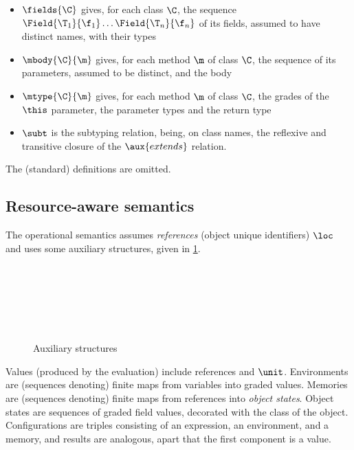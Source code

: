 \begin{itemize}
\item $\fields{\C}$ gives, for each class $\C$, the sequence $\Field{\T_1}{\f_1}\ldots\Field{\T_n}{\f_n}$ of its fields,  assumed to have distinct names,   with their types
\item $\mbody{\C}{\m}$ gives, for each method $\m$ of class $\C$, the sequence of its parameters, assumed to be distinct, and the body
\item  $\mtype{\C}{\m}$ gives, for each method $\m$ of class $\C$, the grades of the $\this$ parameter, the parameter types and the return type 
\item $\subt$ is the subtyping relation, being, on class names, the reflexive and transitive closure of the $\aux{extends}$ relation. 
\end{itemize}
The (standard) definitions are omitted.


\subsection{Resource-aware semantics} 
The operational semantics assumes \emph{references} (object unique identifiers) $\loc$ and uses some auxiliary structures, given in \cref{fig:auxsem}. 
\begin{figure}
\begin{grammatica}
\\
\\
\\
\\
\\
\end{grammatica}
\caption{Auxiliary structures}
\label{fig:auxsem}
\end{figure}

Values (produced by the evaluation) include references and $\unit$. 
Environments are (sequences denoting) finite maps from variables into graded values. Memories are (sequences denoting) finite maps from references into \emph{object states}. Object states are sequences of  graded field values, decorated with the class of the object. Configurations are triples consisting of an expression, an environment, and a memory, and results are analogous, apart that the first component is a value.

